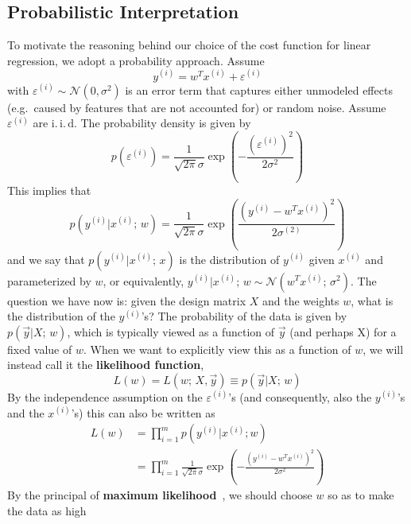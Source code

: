 \documentclass[../main.tex]{subfiles}
\begin{document}
\subsection{Probabilistic Interpretation}
To motivate the reasoning behind our choice of the cost function for linear regression, we adopt a probability
approach.
%
Assume
\begin{equation}
  y^{(i)} = w^{T} x^{(i)} + \varepsilon^{(i)}
\end{equation}
with $\varepsilon^{(i)} \sim \mathcal{N}(0, \sigma^{2})$ is an error term that captures either unmodeled effects (e.g.\
caused by features that are not accounted for) or random noise.
%
Assume $\varepsilon^{(i)}$ are $\mathrm{i}.\,\mathrm{i}.\,\mathrm{d}$. The probability density is given by
%
\begin{equation}
  p(\varepsilon^{(i)}) = \frac{1}{\sqrt{2\pi} \sigma} \exp{\left(-\frac{{(\varepsilon^{(i)})}^{2}}{2\sigma^{2}}\right)}
\end{equation}
%
This implies that
%
\begin{equation}
  p(y^{(i)} | x^{(i)}; \, w) = \frac{1}{\sqrt{2\pi}\sigma} \exp{\left(\frac{{(y^{(i)} - w^{T}
  x^{(i)})}^{2}}{2\sigma^{(2)}}\right)}
\end{equation}
%
and we say that $p(y^{(i)} | x^{(i)}; \, x)$ is the distribution of $y^{(i)}$ given $x^{(i)}$ and parameterized
by $w$, or equivalently, $y^{(i)} | x^{(i)};\, w \sim \mathcal{N}(w^{T} x^{(i)};\, \sigma^{2})$.
%
The question we have now is: given the design matrix $X$ and the weights $w$, what is the distribution of the
$y^{(i)}$'s?
%
The probability of the data is given by $p(\vec{y} | X;\, w)$, which is typically viewed as a function of $\vec{y}$
(and perhaps X) for a fixed value of $w$.
%
When we want to explicitly view this as a function of $w$, we will instead call it the \textbf{likelihood function},
%
\begin{equation}
  L(w) = L(w;\, X, \vec{y}) \equiv p(\vec{y} | X;\, w)%
\label{eq:likelihood_fn}
\end{equation}
%
By the independence assumption on the $\varepsilon^{(i)}$'s (and consequently, also the $y^{(i)}$'s and the
$x^{(i)}$'s) this can also be written as 
%
\begin{align}
  L(w) &= \prod_{i=1}^{m} p(y^{(i)} | x^{(i)}; w)\\
       &= \prod_{i=1}^{m}\frac{1}{\sqrt{2\pi}\sigma}\exp{\left(-\frac{{(y^{(i)} - w^{T}
       x^{(i)})}^{2}}{2\sigma^{2}}\right)}
\end{align}
%
By the principal of \textbf{maximum likelihood}~\cite{ng2012cs229}, we should choose $w$ so as to make the data as high
\end{document}
